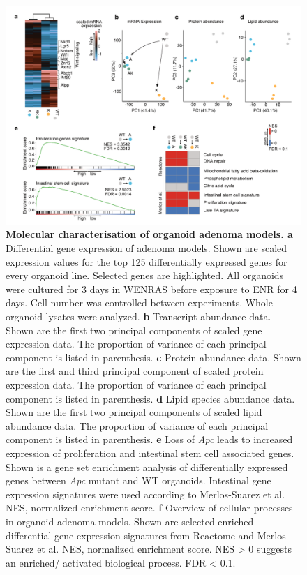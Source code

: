 \begin{flushleft}
\begin{figure}[h]
\centering
\includegraphics[width=\textwidth,
                height=\textheight,
                keepaspectratio]{figures/adenomaprofiling/pdf/fig_1_6_1_2.pdf}
\caption[Molecular characterisation of organoid adenoma models]{\textbf{Molecular characterisation of organoid adenoma models. a} Differential gene expression of adenoma models. Shown are scaled expression values for the top 125 differentially expressed genes for every organoid line. Selected genes are highlighted. All organoids were cultured for 3 days in WENRAS before exposure to ENR for 4 days. Cell number was controlled between experiments. Whole organoid lysates were analyzed. 
\textbf{b} Transcript abundance data. Shown are the first two principal components of scaled gene expression data. The proportion of variance of each principal component is listed in parenthesis. 
\textbf{c} Protein abundance data. Shown are the first and third principal component of scaled protein expression data. The proportion of variance of each principal component is listed in parenthesis. 
\textbf{d} Lipid species abundance data. Shown are the first two principal components of scaled lipid abundance data. The proportion of variance of each principal component is listed in parenthesis. 
\textbf{e} Loss of \textit{Apc} leads to increased expression of proliferation and intestinal stem cell associated genes. Shown is a gene set enrichment analysis of differentially expressed genes between \textit{Apc} mutant and WT organoids. Intestinal gene expression signatures were used according to Merlos-Suarez et al. NES, normalized enrichment score. 
\textbf{f} Overview of cellular processes in organoid adenoma models. Shown are selected enriched differential gene expression signatures from Reactome and Merlos-Suarez et al. NES, normalized enrichment score. NES > 0 suggests an enriched/ activated biological process. FDR < 0.1.}
\label{fig_161}
\end{figure}
\bigbreak


\end{flushleft}
